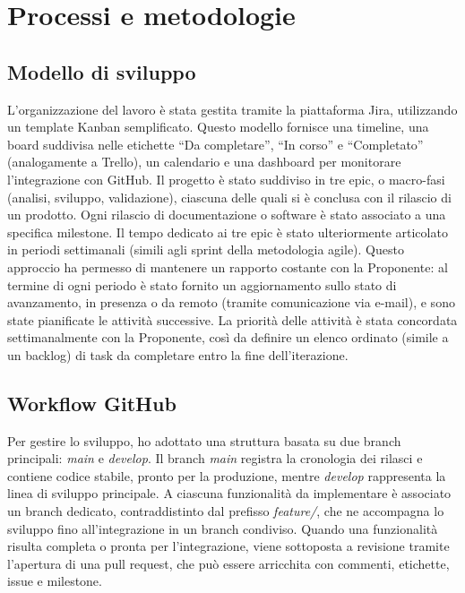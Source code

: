 \chapter{Processi e metodologie}
\label{cap:processi-metodologie}


\section{Modello di sviluppo}

\par L’organizzazione del lavoro è stata gestita tramite la piattaforma Jira, utilizzando un template Kanban semplificato. Questo modello fornisce una timeline, una board suddivisa nelle etichette “Da completare”, “In corso” e “Completato” (analogamente a Trello), un calendario e una dashboard per monitorare l’integrazione con GitHub. Il progetto è stato suddiviso in tre epic, o macro-fasi (analisi, sviluppo, validazione), ciascuna delle quali si è conclusa con il rilascio di un prodotto. Ogni rilascio di documentazione o software è stato associato a una specifica milestone. Il tempo dedicato ai tre epic è stato ulteriormente articolato in periodi settimanali (simili agli sprint della metodologia agile). Questo approccio ha permesso di mantenere un rapporto costante con la Proponente: al termine di ogni periodo è stato fornito un aggiornamento sullo stato di avanzamento, in presenza o da remoto (tramite comunicazione via e-mail), e sono state pianificate le attività successive. La priorità delle attività è stata concordata settimanalmente con la Proponente, così da definire un elenco ordinato (simile a un backlog) di task da completare entro la fine dell’iterazione.

\section{Workflow GitHub}

\par Per gestire lo sviluppo, ho adottato una struttura basata su due branch principali: \textit{main} e \textit{develop}. Il branch \textit{main} registra la cronologia dei rilasci e contiene codice stabile, pronto per la produzione, mentre \textit{develop} rappresenta la linea di sviluppo principale. A ciascuna funzionalità da implementare è associato un branch dedicato, contraddistinto dal prefisso \textit{feature/}, che ne accompagna lo sviluppo fino all’integrazione in un branch condiviso. Quando una funzionalità risulta completa o pronta per l’integrazione, viene sottoposta a revisione tramite l’apertura di una pull request, che può essere arricchita con commenti, etichette, issue e milestone.

